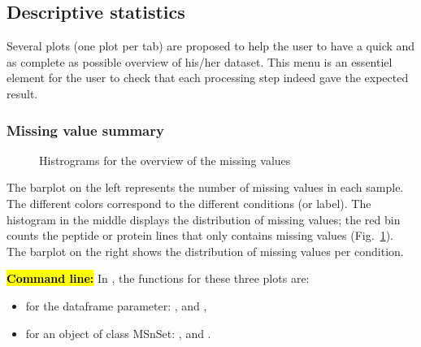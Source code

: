 \documentclass[12pt]{article}
\begin{document}
\subsection{Descriptive statistics}\label{sec:descriptivestatistics}

Several plots (one plot per tab) are proposed to help the user to have a 
quick and as complete as possible overview of his/her dataset. This menu is 
an essentiel element for the user to check that each processing step indeed 
gave the expected result.


\subsubsection{Missing value summary}


\begin {figure}
\centering
{}
\caption{Histrograms for the overview of the missing values}\label{fig:sdmv}
\end {figure}

The barplot on the left represents the number of missing values in each 
sample. The different colors correspond to the different conditions (or label).
The histogram in the middle displays the distribution of missing values; the 
red bin counts the peptide or protein lines that only contains missing values 
(Fig.~\ref{fig:sdmv}).
{The barplot on the right shows the distribution of missing values per 
condition.}

\hl{\bf Command line:} In , the functions for these three 
plots are:
\begin{itemize}
\item for the dataframe parameter: , 
 and ,
\item for an object of class MSnSet: , 
 and 
.
\end{itemize}
\end{document}
